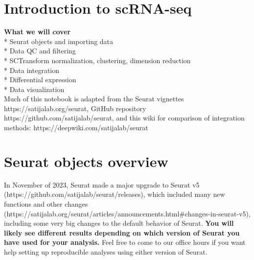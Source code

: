 \documentclass[
  letterpaper,
  DIV=11,
  numbers=noendperiod]{scrreprt}
\begin{document}
\section{Introduction to scRNA-seq}\label{introduction-to-scrna-seq}

\textbf{What we will cover}\\
* Seurat objects and importing data\\
* Data QC and filtering\\
* SCTransform normalization, clustering, dimension reduction\\
* Data integration\\
* Differential expression\\
* Data visualization\\

Much of this notebook is adapted from the Seurat vignettes
https://satijalab.org/seurat, GitHub repository
https://github.com/satijalab/seurat, and this wiki for comparison of
integration methods: https://deepwiki.com/satijalab/seurat

\section{Seurat objects overview}\label{seurat-objects-overview}

\begin{tcolorbox}[enhanced jigsaw, arc=.35mm, titlerule=0mm, left=2mm, toprule=.15mm, leftrule=.75mm, coltitle=black, opacityback=0, colframe=quarto-callout-important-color-frame, bottomrule=.15mm, breakable, colbacktitle=quarto-callout-important-color!10!white, opacitybacktitle=0.6, rightrule=.15mm, bottomtitle=1mm, toptitle=1mm, title=\textcolor{quarto-callout-important-color}{\faExclamation}\hspace{0.5em}{Important}, colback=white]

In November of 2023, Seurat made a major upgrade to Seurat v5
(https://github.com/satijalab/seurat/releases), which included many new
functions and other changes
(https://satijalab.org/seurat/articles/announcements.html\#changes-in-seurat-v5),
including some very big changes to the default behavior of Seurat.
\textbf{You will likely see different results depending on which version
of Seurat you have used for your analysis.} Feel free to come to our
office hours if you want help setting up reproducible analyses using
either version of Seurat.

\end{tcolorbox}
\end{document}
